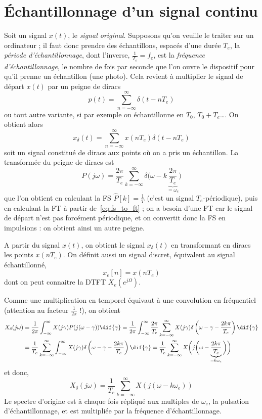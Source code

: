 \documentclass{article}
\begin{document}
\section{Échantillonnage d'un signal continu}

Soit un signal $x(t)$, le \emph{signal original}. Supposons qu'on veuille le traiter sur un ordinateur ; il faut donc prendre des échantillons, espacés d'une durée $T_e$, la \emph{période d'échantillonnage}, dont l'inverse, $\frac{1}{T_e} = f_e$, est la \emph{fréquence d'échantillonnage}, le nombre de fois par seconde que l'on ouvre le dispositif pour qu'il prenne un échantillon (une photo). Cela revient à multiplier le signal de départ $x(t)$ par un peigne de diracs
\[ p(t) = \sum_{n=-\infty}^{\infty} \delta(t - n T_e) \]
ou tout autre variante, si par exemple on échantillonne en $T_0$, $T_0+T_e$\dots. On obtient alors
\begin{equation}
x_\delta(t) = \sum_{n=-\infty}^{\infty} x(nT_e) \delta(t-nT_e)
\label{eq:sampling_xdeltat}
\end{equation}
soit un signal constitué de diracs aux points où on a pris un échantillon. La transformée du peigne de diracs est
\begin{equation}
P(j\omega) =  \frac{2\pi}{T_e} \sum_{k=-\infty}^{\infty} \delta\bigg( \omega - k \underbrace{\frac{2\pi}{T_e}}_{=\omega_e} \bigg)
\label{eq:ft_peigne}
\end{equation}
que l'on obtient en calculant la FS $\hat{P}[k]=\frac{1}{T}$ (c'est un signal $T_e$-périodique), puis en calculant la FT à partir de~\eqref{eq:fs_to_ft} ; on a besoin d'une FT car le signal de départ n'est pas forcément périodique, et on convertit donc la FS en impulsions : on obtient ainsi un autre peigne.

A partir du signal $x(t)$, on obtient le signal $x_\delta(t)$ en transformant en diracs les points $x(nT_e)$. On définit aussi un signal discret, équivalent au signal échantillonné,
\[ x_e[n] = x(nT_e) \]
dont on peut connaitre la DTFT $X_e\left(e^{j\Omega}\right)$.

Comme une multiplication en temporel équivaut à une convolution en fréquentiel (attention au facteur $\frac{1}{2\pi}$ !), on obtient
\begin{align*}
X_\delta(j\omega) &= \frac{1}{2\pi} \int_{-\infty}^{\infty} X(j\gamma) P(j(\omega-\gamma)) \dif{\gamma} = \frac{1}{2\pi} \int_{-\infty}^{\infty} \frac{2\pi}{T_e} \sum_{k=-\infty}^{\infty} X(j\gamma) \delta\left(\omega-\gamma-\frac{2k\pi}{T_e}\right) \dif{\gamma} \\
&= \frac{1}{T_e} \sum_{k=-\infty}^{\infty} \int_{-\infty}^{\infty} X(j\gamma) \delta\left(\omega-\gamma-\frac{2k\pi}{T_e}\right) \dif{\gamma} = \frac{1}{T_e} \sum_{k=-\infty}^{\infty} X\bigg(j\bigg(\omega-\underbrace{\frac{2k\pi}{T_e}}_{=k\omega_e}\bigg)\bigg)
\end{align*}
et donc,
\begin{equation}
X_\delta(j\omega) = \frac{1}{T_e} \sum_{k=-\infty}^{\infty} X\left(j\left(\omega-k\omega_e\right)\right)
\label{eq:sampling_ft_delta_from_ft}
\end{equation}
Le spectre d'origine est à chaque fois répliqué aux multiples de $\omega_e$, la pulsation d'échantillonnage, et est multipliée par la fréquence d'échantillonnage.
\end{document}
